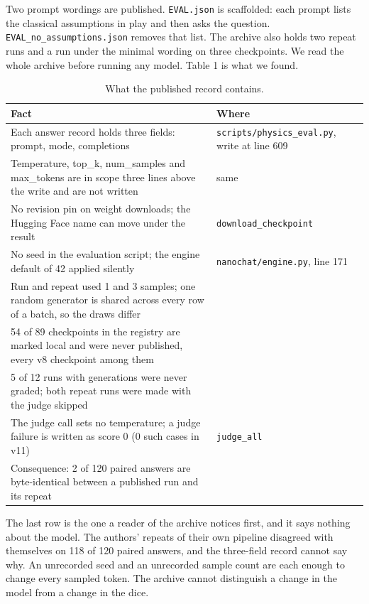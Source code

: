 \documentclass[reprint,prx,amsmath,amssymb,aps,superscriptaddress]{revtex4-2}
\begin{document}
Two prompt wordings are published. \texttt{EVAL.json} is scaffolded: each prompt lists the classical assumptions in play and then asks the question. \texttt{EVAL\_no\_assumptions.json} removes that list. The archive also holds two repeat runs and a run under the minimal wording on three checkpoints. We read the whole archive before running any model. Table 1 is what we found.

\begin{table}[t]
\caption{What the published record contains.}
\begin{ruledtabular}
\begin{tabular}{ll}
Fact & Where \\
\hline
Each answer record holds three fields: prompt, mode, completions & \texttt{scripts/physics\_eval.py}, write at line 609 \\
Temperature, top\_k, num\_samples and max\_tokens are in scope three lines above the write and are not written & same \\
No revision pin on weight downloads; the Hugging Face name can move under the result & \texttt{download\_checkpoint} \\
No seed in the evaluation script; the engine default of 42 applied silently & \texttt{nanochat/engine.py}, line 171 \\
Run and repeat used 1 and 3 samples; one random generator is shared across every row of a batch, so the draws differ &  \\
54 of 89 checkpoints in the registry are marked local and were never published, every v8 checkpoint among them &  \\
5 of 12 runs with generations were never graded; both repeat runs were made with the judge skipped &  \\
The judge call sets no temperature; a judge failure is written as score 0 (0 such cases in v11) & \texttt{judge\_all} \\
Consequence: 2 of 120 paired answers are byte-identical between a published run and its repeat &  \\
\end{tabular}
\end{ruledtabular}
\end{table}

The last row is the one a reader of the archive notices first, and it says nothing about the model. The authors' repeats of their own pipeline disagreed with themselves on 118 of 120 paired answers, and the three-field record cannot say why. An unrecorded seed and an unrecorded sample count are each enough to change every sampled token. The archive cannot distinguish a change in the model from a change in the dice.
\end{document}

